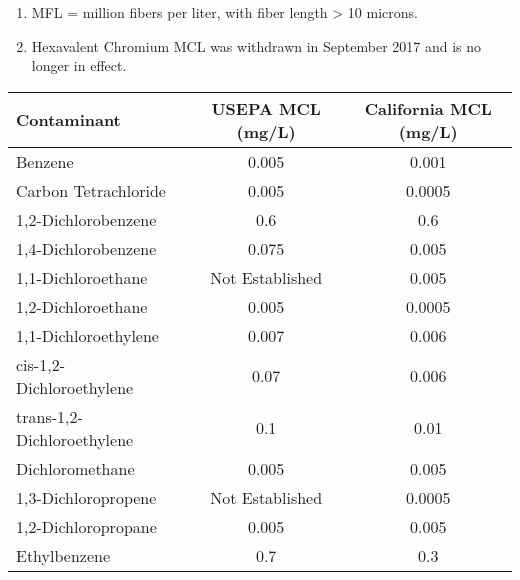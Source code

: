 \small{\begin{enumerate}
\item MFL = million fibers per liter, with fiber length > 10 microns.
\item Hexavalent Chromium MCL was withdrawn in September 2017 and is no longer in effect.
\end{enumerate}}


\begin{table}[ht]
\begin{center}
\begin{tabular}{|l|c|c|}
\hline
Contaminant  & USEPA   MCL  (mg/L) & California   MCL  (mg/L) \\
\hline
Benzene                                                                    & 0.005  & 0.001  \\ \hline
Carbon   Tetrachloride                                                     & 0.005 & 0.0005\\ \hline
1,2-Dichlorobenzene                                                        & 0.6    & 0.6  \\ \hline
1,4-Dichlorobenzene                                                        & 0.075  & 0.005 \\ \hline
1,1-Dichloroethane                                                         & Not   Established & 0.005   \\ \hline
1,2-Dichloroethane                                                         & 0.005                                                                                                   & 0.0005  \\ \hline
1,1-Dichloroethylene                                                       & 0.007   & 0.006 \\ \hline
cis-1,2-   Dichloroethylene                                                & 0.07  & 0.006   \\ \hline
trans-1,2-   Dichloroethylene                                              & 0.1    & 0.01 \\ \hline
Dichloromethane                                                            & 0.005    & 0.005 \\ \hline
1,3-Dichloropropene                                                        & Not   Established  & 0.0005 \\ \hline
1,2-Dichloropropane                                                        & 0.005  & 0.005   \\ \hline
Ethylbenzene                                                               & 0.7  & 0.3     \\ \hline

\end{tabular}
\end{center}
\end{table}
